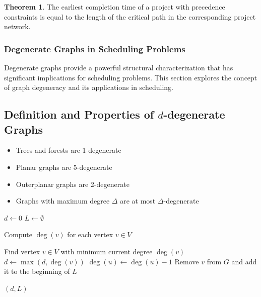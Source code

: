 \documentclass{article}
\theoremstyle{definition}
\newtheorem{theorem}{Theorem}
\begin{document}
\begin{theorem}
The earliest completion time of a project with precedence constraints is equal to the length of the critical path in the corresponding project network.
\end{theorem}

\subsubsection{Degenerate Graphs in Scheduling Problems}
\label{sec:degenerate}

Degenerate graphs provide a powerful structural characterization that has significant implications for scheduling problems. This section explores the concept of graph degeneracy and its applications in scheduling.

\subsection*{Definition and Properties of $d$-degenerate Graphs}

\begin{itemize}
    \item Trees and forests are 1-degenerate
    \item Planar graphs are 5-degenerate
    \item Outerplanar graphs are 2-degenerate
    \item Graphs with maximum degree $\Delta$ are at most $\Delta$-degenerate
\end{itemize}

\begin{algorithm}
\caption{Computing Graph Degeneracy}
\label{alg:compute-degeneracy}
\begin{algorithmic}[1]
        \State $d \gets 0$ 
        \State $L \gets \emptyset$ 
        
        \State Compute $\deg(v)$ for each vertex $v \in V$
        
            \State Find vertex $v \in V$ with minimum current degree $\deg(v)$
            \State $d \gets \max(d, \deg(v))$ 
                \State $\deg(u) \gets \deg(u) - 1$ 
            \EndFor
            \State Remove $v$ from $G$ and add it to the beginning of $L$
        \EndWhile
        
        \State \Return $(d, L)$ 
    \EndProcedure
\end{algorithmic}
\end{algorithm}
\end{document}
